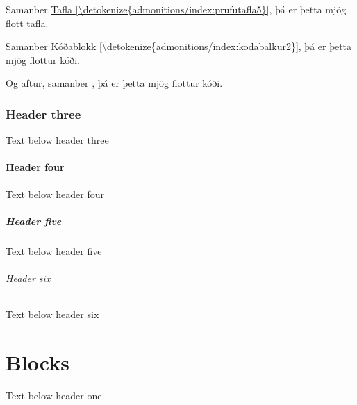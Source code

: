 \documentclass[a4paper,10pt,icelandic]{sphinxmanual}
\begin{document}
\sphinxAtStartPar
Samanber \hyperref[\detokenize{admonitions/index:prufutafla5}]{Tafla \ref{\detokenize{admonitions/index:prufutafla5}}}, þá er þetta mjög flott tafla.
\def\sphinxLiteralBlockLabel{\label{\detokenize{admonitions/index:kodabalkur2}}\label{\detokenize{admonitions/index:kodanafn}}}
\begin{sphinxVerbatim}[commandchars=\\\{\}]
 
\end{sphinxVerbatim}

\sphinxAtStartPar
Samanber \hyperref[\detokenize{admonitions/index:kodabalkur2}]{Kóðablokk \ref{\detokenize{admonitions/index:kodabalkur2}}}, þá er þetta mjög flottur kóði.

\sphinxAtStartPar
Og aftur, samanber {\hyperref[\detokenize{admonitions/index:kodanafn}]{}}, þá er þetta mjög flottur kóði.


\subsection{Header three}
\label{\detokenize{admonitions/index:header-three}}
\sphinxAtStartPar
Text below header three


\subsubsection{Header four}
\label{\detokenize{admonitions/index:header-four}}
\sphinxAtStartPar
Text below header four


\paragraph{Header five}
\label{\detokenize{admonitions/index:header-five}}
\sphinxAtStartPar
Text below header five


\subparagraph{Header six}
\label{\detokenize{admonitions/index:header-six}}
\sphinxAtStartPar
Text below header six

\sphinxstepscope


\chapter{Blocks}
\label{\detokenize{blocks/index:blocks}}\label{\detokenize{blocks/index::doc}}
\sphinxAtStartPar
Text below header one
\end{document}

